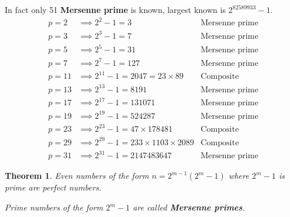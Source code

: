 \documentclass[letterpaper,12pt,oneside]{article}
\newtheorem{theorem}{Theorem}
\begin{document}
In fact only 51 \textbf{Mersenne prime} is known, largest known is $2^{82589933}-1$.
\begin{align*}
    p = 2 &\implies 2^2-1=3 & \text{Mersenne prime}\\
    p = 3 &\implies 2^3-1=7 & \text{Mersenne prime}\\
    p = 5 &\implies 2^5-1=31 & \text{Mersenne prime}\\
    p = 7 &\implies 2^7-1=127 & \text{Mersenne prime}\\
    p = 11 &\implies 2^{11}-1=2047=23\times 89 & \text{Composite}\\
    p = 13 &\implies 2^{13}-1=8191 & \text{Mersenne prime}\\
    p = 17 &\implies 2^{17}-1=131071 & \text{Mersenne prime}\\
    p = 19 &\implies 2^{19}-1=524287 & \text{Mersenne prime}\\
    p = 23 &\implies 2^{23}-1=47\times 178481 & \text{Composite}\\
    p = 29 &\implies 2^{29}-1=233\times 1103\times 2089 & \text{Composite}\\
    p = 31 &\implies 2^{31}-1=2147483647 & \text{Mersenne prime}
\end{align*}
\begin{theorem}
    Even numbers of the form $n=2^{m-1}(2^m-1)$ where $2^m-1$ is prime are perfect numbers.

    Prime numbers of the form $2^m-1$ are called \textbf{Mersenne primes}.
\end{theorem}
\end{document}
